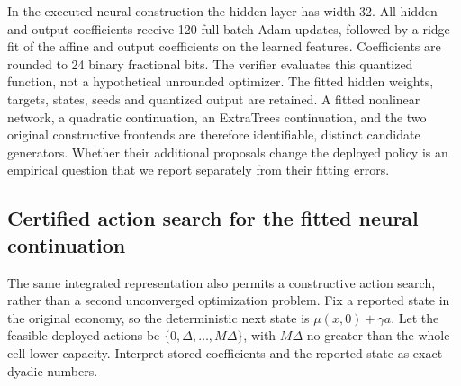 In the executed neural construction the hidden layer has width 32. All hidden and output coefficients receive 120 full-batch Adam updates, followed by a ridge fit of the affine and output coefficients on the learned features. Coefficients are rounded to 24 binary fractional bits. The verifier evaluates this quantized function, not a hypothetical unrounded optimizer. The fitted hidden weights, targets, states, seeds and quantized output are retained. A fitted nonlinear network, a quadratic continuation, an ExtraTrees continuation, and the two original constructive frontends are therefore identifiable, distinct candidate generators. Whether their additional proposals change the deployed policy is an empirical question that we report separately from their fitting errors.

\subsection{Certified action search for the fitted neural continuation}
The same integrated representation also permits a constructive action search, rather than a second unconverged optimization problem. Fix a reported state in the original economy, so the deterministic next state is $\mu(x,0)+\gamma a$. Let the feasible deployed actions be $\{0,\Delta,\ldots,M\Delta\}$, with $M\Delta$ no greater than the whole-cell lower capacity. Interpret stored coefficients and the reported state as exact dyadic numbers.

